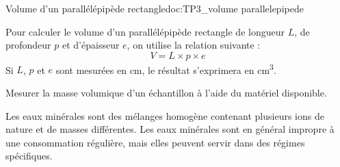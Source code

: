 \begin{doc}{Volume d'un parallélépipède rectangle}{doc:TP3_volume parallelepipede}
  \begin{multicols}{2}
    Pour calculer le volume d'un parallélépipède rectangle de longueur $L$, de profondeur $p$ et d’épaisseur $e$, on utilise la relation suivante :
    \begin{equation*}
      V = L \times p \times e
    \end{equation*}
    Si $L$, $p$ et $e$ sont mesurées en \unit{\cm}, le résultat s’exprimera en \unit{\cubic\cm}.

    \centering
  \end{multicols}
\end{doc}

\mesure Mesurer la masse volumique d'un échantillon à l'aide du matériel disponible.




\begin{importants}
  Les eaux minérales sont des mélanges homogène contenant plusieurs ions de nature et de masses différentes.
  Les eaux minérales sont en général impropre à une consommation régulière, mais elles peuvent servir dans des régimes spécifiques.
  
\end{importants}



